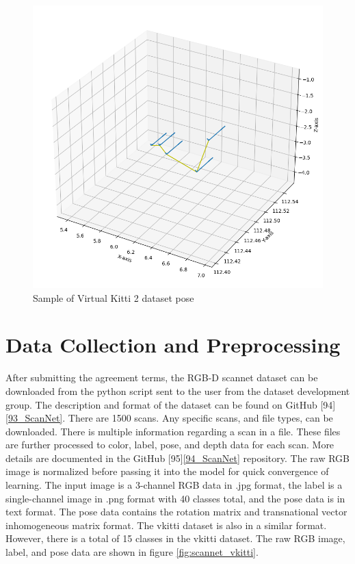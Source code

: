 	\begin{figure}[h]
		\centering
		\includegraphics[width=14cm]{images/pose_viz_vkitti.png}
		\caption{Sample of Virtual Kitti 2 dataset pose}
		\label{fig:sample_pose_scannet_vkitti_2}
	\end{figure}
	
	\section{Data Collection and Preprocessing}
	
	After submitting the agreement terms, the RGB-D scannet dataset can be downloaded from the python script sent to the user from the dataset development group. The description and format of the dataset can be found on GitHub [94]\ref{93_ScanNet}. There are 1500 scans. Any specific scans, and file types,  can be downloaded. There is multiple information regarding a scan in a file. These files are further processed to color, label, pose, and depth data for each scan. More details are documented in the GitHub [95]\ref{94_ScanNet} repository. The raw RGB image is normalized before passing it into the model for quick convergence of learning. The input image is a 3-channel RGB data in .jpg format, the label is a single-channel image in .png format with 40 classes total, and the pose data is in text format. The pose data contains the rotation matrix and transnational vector inhomogeneous matrix format. The vkitti dataset is also in a similar format. However, there is a total of 15 classes in the vkitti dataset. The raw RGB image, label, and pose data are shown in figure \ref{fig:scannet_vkitti}. 

